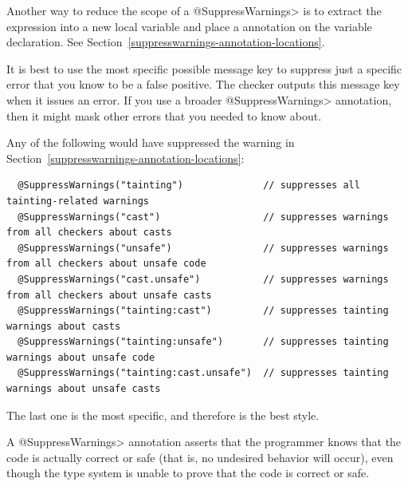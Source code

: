 Another way to reduce the scope of a \<@SuppressWarnings> is to
extract the expression into a new local variable
and place a  annotation on the variable
declaration.  See Section~\ref{suppresswarnings-annotation-locations}.





\label{compiler-message-keys}

It is best to use the most specific possible message key to suppress just a
specific error that you know to be a false positive.  The checker outputs
this message key when it issues an error.  If you use a broader
\<@SuppressWarnings> annotation, then it might mask other errors that you
needed to know about.

Any of the following would have suppressed the warning in
Section~\ref{suppresswarnings-annotation-locations}:

\begin{Verbatim}
  @SuppressWarnings("tainting")              // suppresses all tainting-related warnings
  @SuppressWarnings("cast")                  // suppresses warnings from all checkers about casts
  @SuppressWarnings("unsafe")                // suppresses warnings from all checkers about unsafe code
  @SuppressWarnings("cast.unsafe")           // suppresses warnings from all checkers about unsafe casts
  @SuppressWarnings("tainting:cast")         // suppresses tainting warnings about casts
  @SuppressWarnings("tainting:unsafe")       // suppresses tainting warnings about unsafe code
  @SuppressWarnings("tainting:cast.unsafe")  // suppresses tainting warnings about unsafe casts
\end{Verbatim}

The last one is the most specific, and therefore is the best style.



A \<@SuppressWarnings> annotation asserts that the programmer knows that
the code is actually correct or safe (that is, no undesired behavior will
occur), even though the type system is unable to prove that the code is
correct or safe.

